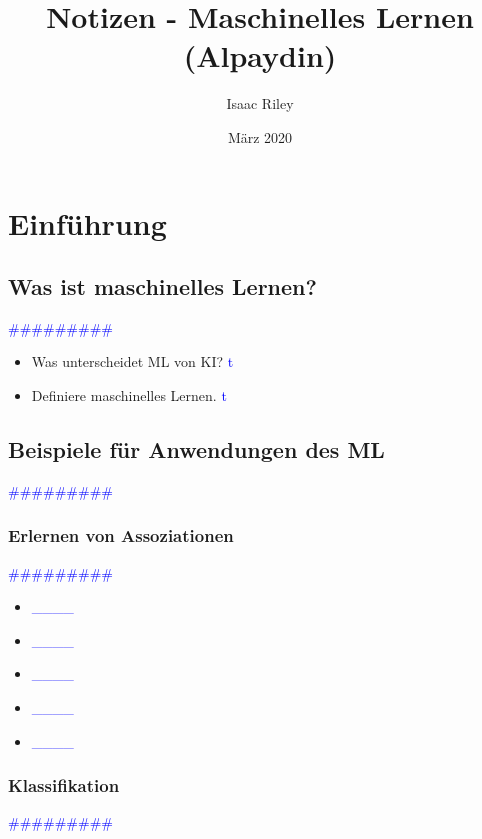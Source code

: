 \documentclass{article}
\title{Notizen - Maschinelles Lernen (Alpaydin)}
\author{Isaac Riley}
\date{März 2020}
\begin{document}
\maketitle

\section{Einführung} %
  \subsection{Was ist maschinelles Lernen?} %
      \textcolor{blue}{\#\#\#\#\#\#\#\#\#}
            \begin{itemize}
            \color{red}
              \item Was unterscheidet ML von KI? \textcolor{blue}{t} 
            \color{ForestGreen}
              \item Definiere maschinelles Lernen. \textcolor{blue}{t} 
            \end{itemize}      
  \subsection{Beispiele für Anwendungen des ML} %
      \textcolor{blue}{\#\#\#\#\#\#\#\#\#}  
    \subsubsection{Erlernen von Assoziationen} %
      \textcolor{blue}{\#\#\#\#\#\#\#\#\#}

      \begin{itemize}
      \color{red}
        \item  \textcolor{blue}{\_\_\_\_} 
        \item  \textcolor{blue}{\_\_\_\_}
      \color{ForestGreen}
        \item  \textcolor{blue}{\_\_\_\_} 
        \item  \textcolor{blue}{\_\_\_\_}
        \item  \textcolor{blue}{\_\_\_\_}
      \end{itemize}

    \subsubsection{Klassifikation} %
      \textcolor{blue}{\#\#\#\#\#\#\#\#\#}
\end{document}
